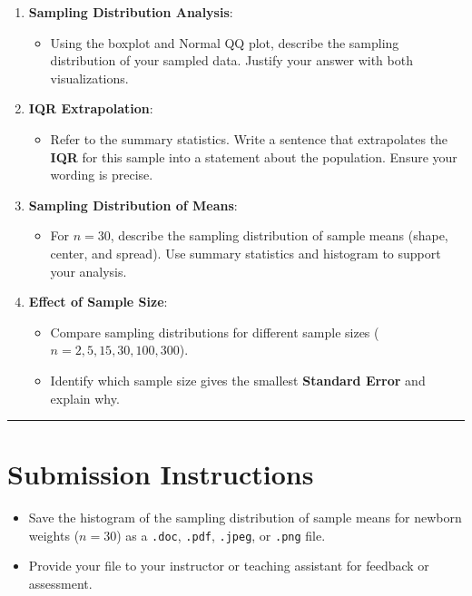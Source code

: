 \documentclass[oneside,openany]{book}
\providecommand{\tightlist}{%
  \setlength{\itemsep}{0pt}\setlength{\parskip}{0pt}}
\begin{document}
\begin{enumerate}
\def\labelenumi{\arabic{enumi}.}
\tightlist
\item
  \textbf{Sampling Distribution Analysis}:

  \begin{itemize}
  \tightlist
  \item
    Using the boxplot and Normal QQ plot, describe the sampling distribution of your sampled data. Justify your answer with both visualizations.
  \end{itemize}
\item
  \textbf{IQR Extrapolation}:

  \begin{itemize}
  \tightlist
  \item
    Refer to the summary statistics. Write a sentence that extrapolates the \textbf{IQR} for this sample into a statement about the population. Ensure your wording is precise.
  \end{itemize}
\item
  \textbf{Sampling Distribution of Means}:

  \begin{itemize}
  \tightlist
  \item
    For \(n = 30\), describe the sampling distribution of sample means (shape, center, and spread). Use summary statistics and histogram to support your analysis.
  \end{itemize}
\item
  \textbf{Effect of Sample Size}:

  \begin{itemize}
  \tightlist
  \item
    Compare sampling distributions for different sample sizes (\(n = 2, 5, 15, 30, 100, 300\)).
  \item
    Identify which sample size gives the smallest \textbf{Standard Error} and explain why.
  \end{itemize}
\end{enumerate}

\begin{center}\rule{0.5\linewidth}{0.5pt}\end{center}

\section{Submission Instructions}\label{submission-instructions-2}

\begin{itemize}
\tightlist
\item
  Save the histogram of the sampling distribution of sample means for newborn weights (\(n = 30\)) as a \texttt{.doc}, \texttt{.pdf}, \texttt{.jpeg}, or \texttt{.png} file.
\item
  Provide your file to your instructor or teaching assistant for feedback or assessment.
\end{itemize}
\end{document}
